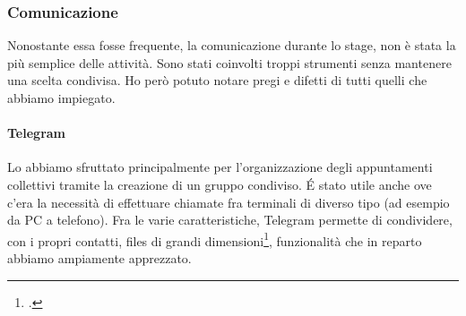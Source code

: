 \subsubsection{Comunicazione}
Nonostante essa fosse frequente, la comunicazione durante lo stage, non è stata la più semplice delle attività. Sono stati coinvolti troppi strumenti senza mantenere una scelta condivisa. Ho però potuto notare pregi e difetti di tutti quelli che abbiamo impiegato.
\paragraph{Telegram} Lo abbiamo sfruttato principalmente per l'organizzazione degli appuntamenti collettivi tramite la creazione di un gruppo condiviso. \'E stato utile anche ove c'era la necessità di effettuare chiamate fra terminali di diverso tipo (ad esempio da PC a telefono).
Fra le varie caratteristiche, Telegram permette di condividere, con i propri contatti, files di grandi dimensioni\footcite{site:telegram}, funzionalità che in reparto abbiamo ampiamente apprezzato.
